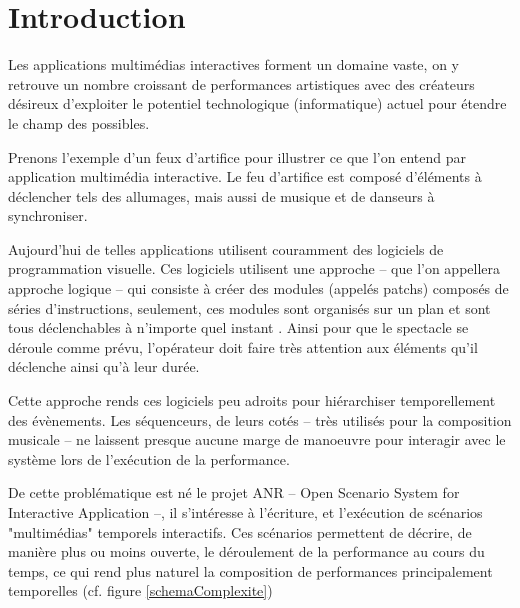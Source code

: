 \chapter*{Introduction}

Les applications multimédias interactives forment un domaine vaste, on y retrouve un nombre croissant de performances artistiques avec des créateurs désireux d'exploiter le potentiel technologique (informatique) actuel pour étendre le champ des possibles.

Prenons l'exemple d'un feux d'artifice pour illustrer ce que l'on entend par application multimédia interactive. Le feu d'artifice  est composé d'éléments à déclencher tels des allumages, mais aussi de musique et de danseurs à synchroniser.


Aujourd'hui de telles applications utilisent couramment des logiciels de programmation visuelle\cite{Cycling742015}\cite{Pure2015}.
Ces logiciels utilisent une approche -- que l'on appellera approche logique -- qui consiste à créer des modules (appelés patchs) composés de séries d'instructions, seulement, ces modules sont organisés sur un plan et sont tous déclenchables à n'importe quel instant . Ainsi pour que le spectacle se déroule comme prévu, l'opérateur doit faire très attention aux éléments qu'il déclenche ainsi qu'à leur durée.


Cette approche rends ces logiciels peu adroits pour hiérarchiser temporellement des évènements. Les séquenceurs, de leurs cotés -- très utilisés pour la composition musicale -- ne laissent presque aucune marge de manoeuvre pour interagir avec le système lors de l'exécution de la performance.

De cette problématique est né le projet ANR \ossia{} -- Open Scenario System for Interactive Application --, il s'intéresse à l'écriture, et l'exécution de scénarios "multimédias" temporels interactifs. Ces scénarios permettent de décrire, de manière plus ou moins ouverte, le déroulement de la performance au cours du temps, ce qui rend plus naturel la composition de performances principalement temporelles (cf. figure \ref{schemaComplexite})

